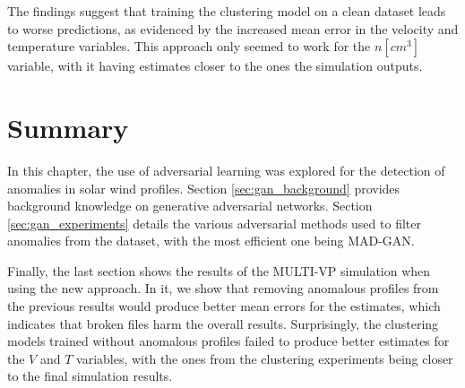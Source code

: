 The findings suggest that training the clustering model on a clean dataset leads to worse predictions, as evidenced by the increased mean error in the velocity and temperature variables. This approach only seemed to work for the $n [cm^3]$ variable, with it having estimates closer to the ones the simulation outputs.


\section{Summary}\label{sec:gan_summary}
In this chapter, the use of adversarial learning was explored for the detection of anomalies in solar wind profiles. Section \ref{sec:gan_background} provides background knowledge on generative adversarial networks. Section \ref{sec:gan_experiments} details the various adversarial methods used to filter anomalies from the dataset, with the most efficient one being MAD-GAN. 

Finally, the last section shows the results of the MULTI-VP simulation when using the new approach. In it, we show that removing anomalous profiles from the previous results would produce better mean errors for the estimates, which indicates that broken files harm the overall results. Surprisingly, the clustering models trained without anomalous profiles failed to produce better estimates for the $V$ and $T$ variables, with the ones from the clustering experiments being closer to the final simulation results.

